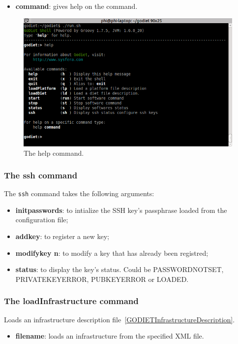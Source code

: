 \begin{itemize}
  \item \textbf{command}: gives help on the command.
\end{itemize}

\begin{figure}[h]
  \centering
  \includegraphics[width=12cm]{fig/2-helpcommand}
  \caption{The help command.\label{fig:GODIETHelp}}
\end{figure}

\subsubsection{The ssh command}
\label{GODIETSSHCommand}

The \verb+ssh+ command takes the following arguments:

\begin{itemize}
\item \textbf{initpasswords}: to intialize the SSH key's passphrase loaded from the configuration file;
\item \textbf{addkey}: to register a new key;
\item \textbf{modifykey n}: to modify a key that has already been registred;
\item \textbf{status}: to display the key's status. Could be PASSWORDNOTSET, PRIVATEKEYERROR, PUBKEYERROR or LOADED.
\end{itemize}

\subsubsection{The loadInfrastructure command}
Loads an infrastructure description file~\ref{GODIETInfrastructureDescription}.

\begin{itemize}
  \item \textbf{filename}: loads an infrastructure from the specified XML file.
\end{itemize}

